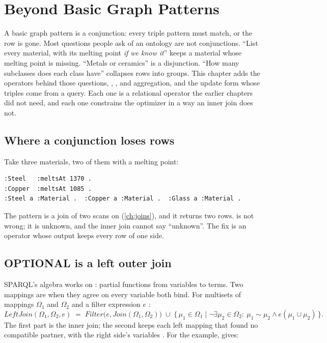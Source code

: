\chapter{Beyond Basic Graph Patterns}
\label{ch:sparql}

A basic graph pattern is a conjunction: every triple pattern must match, or the
row is gone. Most questions people ask of an ontology are not conjunctions.
``List every material, with its melting point \emph{if we know it}'' keeps a
material whose melting point is missing. ``Metals or ceramics'' is a
disjunction. ``How many subclasses does each class have'' collapses rows into
groups. This chapter adds the operators behind those questions, ,
, and aggregation, and the update form whose triples come from a
query. Each one is a relational operator the earlier chapters did not need,
and each one constrains the optimizer in a way an inner join does not.

\section{Where a conjunction loses rows}

Take three materials, two of them with a melting point:
\begin{lstlisting}
:Steel   :meltsAt 1370 .
:Copper  :meltsAt 1085 .
:Steel a :Material .  :Copper a :Material .  :Glass a :Material .
\end{lstlisting}
The pattern  is a join of two
scans on  (\cref{ch:joins}), and it returns two rows.  is
not wrong; it is unknown, and the inner join cannot say ``unknown''. The fix is
an operator whose output keeps every row of one side.

\section{OPTIONAL is a left outer join}

SPARQL's algebra works on : partial functions from
variables to terms. Two mappings are  when they agree on every
variable both bind. For multisets of mappings $\Omega_1$ and $\Omega_2$ and a
filter expression $e$ \cite{sparql,perez2009}:
\[
\mathit{LeftJoin}(\Omega_1, \Omega_2, e) \;=\;
\mathit{Filter}\big(e, \mathit{Join}(\Omega_1, \Omega_2)\big) \;\cup\;
\{\, \mu_1 \in \Omega_1 \mid \neg\exists \mu_2 \in \Omega_2 :\ \mu_1 \sim \mu_2 \wedge e(\mu_1 \cup \mu_2) \,\}.
\]
The first part is the inner join; the second keeps each left mapping that found
no compatible partner, with the right side's variables . For the
example,  gives:

